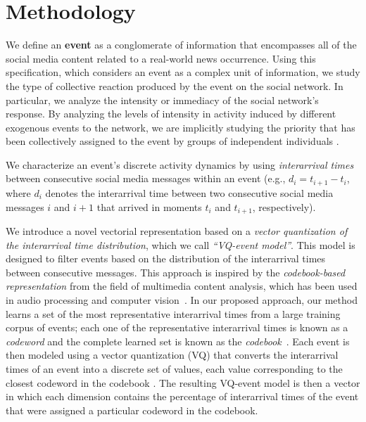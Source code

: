 \section{Methodology}
 
We define an {\bf event} as a conglomerate of information that encompasses all
of the social media content related to a real-world news occurrence. 
%
Using this specification, which considers an event as a complex unit of
information, we study the type of collective reaction produced by the event on
the social network. 
%
In particular, we analyze the intensity or immediacy of the
social network's response. 
%
By analyzing the levels of intensity in activity induced by different exogenous
events to the network, we are implicitly studying the priority that has been
collectively assigned to the event by groups of independent individuals
\cite{barabasi2005origin, karsai2012universal}. 

We characterize an event's discrete activity dynamics by using
\emph{interarrival times} between consecutive social media messages within an
event (e.g., $d_i = t_{i+1}-t_i$, where $d_i$ denotes the interarrival time
between two consecutive social media messages $i$ and $i+1$ that arrived in
moments $t_i$ and $t_{i+1}$, respectively).


We introduce a novel vectorial representation based on a {\em vector
quantization of the interarrival time distribution}, which we call {\em
``VQ-event model''}. 
%
This model is designed to filter events based on the distribution of the
interarrival times between consecutive messages.  
%
This approach is inspired by the {\em codebook-based representation} from the
field of multimedia content analysis, which has been used in audio processing
and computer vision~\cite{ff,Vaizman}.
%
In our proposed approach, our method learns a set of the most representative
interarrival times from a large training corpus of events; 
%
each one of the representative interarrival times is known as a {\em codeword}
and the complete learned set is known as the {\em codebook}~\cite{Vaizman}. 
%
Each event is then modeled using a vector quantization (VQ) that converts the
interarrival times of an event into a discrete set of values, each value
corresponding to the closest codeword in the codebook . 
%
The resulting VQ-event model is then a vector in which each dimension contains
the percentage of interarrival times of the event that were assigned a
particular codeword in the codebook.


